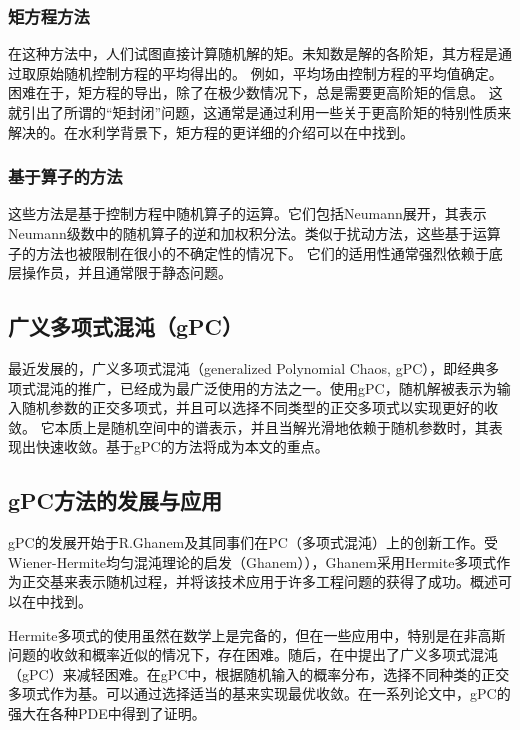 \subsubsection{矩方程方法}

在这种方法中，人们试图直接计算随机解的矩。未知数是解的各阶矩，其方程是通过取原始随机控制方程的平均得出的。 例如，平均场由控制方程的平均值确定。困难在于，矩方程的导出，除了在极少数情况下，总是需要更高阶矩的信息。 这就引出了所谓的“矩封闭”问题，这通常是通过利用一些关于更高阶矩的特别性质来解决的。在水利学背景下，矩方程的更详细的介绍可以在中找到。

\subsubsection{基于算子的方法}

这些方法是基于控制方程中随机算子的运算。它们包括Neumann展开，其表示Neumann级数中的随机算子的逆和加权积分法。类似于扰动方法，这些基于运算子的方法也被限制在很小的不确定性的情况下。 它们的适用性通常强烈依赖于底层操作员，并且通常限于静态问题。

\subsection{广义多项式混沌（gPC）}

最近发展的，广义多项式混沌（generalized Polynomial Chaos, gPC），即经典多项式混沌的推广，已经成为最广泛使用的方法之一。使用gPC，随机解被表示为输入随机参数的正交多项式，并且可以选择不同类型的正交多项式以实现更好的收敛。 它本质上是随机空间中的谱表示，并且当解光滑地依赖于随机参数时，其表现出快速收敛。基于gPC的方法将成为本文的重点。

\subsection{gPC方法的发展与应用}

gPC的发展开始于R.Ghanem及其同事们在PC（多项式混沌）上的创新工作。受Wiener-Hermite均匀混沌理论的启发（Ghanem）），Ghanem采用Hermite多项式作为正交基来表示随机过程，并将该技术应用于许多工程问题的获得了成功。概述可以在中找到。

Hermite多项式的使用虽然在数学上是完备的，但在一些应用中，特别是在非高斯问题的收敛和概率近似的情况下，存在困难。随后，在中提出了广义多项式混沌（gPC）来减轻困难。在gPC中，根据随机输入的概率分布，选择不同种类的正交多项式作为基。可以通过选择适当的基来实现最优收敛。在一系列论文中，gPC的强大在各种PDE中得到了证明。

